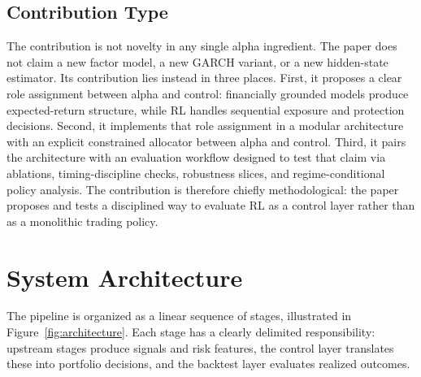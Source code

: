 \documentclass[11pt]{article}
\begin{document}
\subsection{Contribution Type}

The contribution is not novelty in any single alpha ingredient. The paper does
not claim a new factor model, a new GARCH variant, or a new hidden-state
estimator. Its contribution lies instead in three places. First, it proposes a
clear role assignment between alpha and control: financially grounded models
produce expected-return structure, while RL handles sequential exposure and
protection decisions. Second, it implements that role assignment in a modular
architecture with an explicit constrained allocator between alpha and control.
Third, it pairs the architecture with an evaluation workflow designed to test
that claim via ablations, timing-discipline checks, robustness slices, and
regime-conditional policy analysis.
The contribution is therefore chiefly methodological: the paper proposes and
tests a disciplined way to evaluate RL as a control layer rather than as a
monolithic trading policy.

\section{System Architecture}

The pipeline is organized as a linear sequence of stages, illustrated in
Figure~\ref{fig:architecture}. Each stage has a clearly delimited responsibility:
upstream stages produce signals and risk features, the control layer translates
these into portfolio decisions, and the backtest layer evaluates realized
outcomes.
\end{document}
